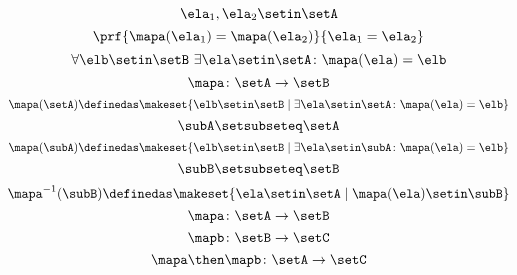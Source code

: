 \begin{forslides}
    \begin{equation}\label{eq:slides_session2_122}
        \ela_1, \ela_2 \setin\setA
    \end{equation}
    \begin{equation}\label{eq:slides_session2_123}
        \prf{\mapa(\ela_1) = \mapa(\ela_2)}{\ela_1 = \ela_2}
    \end{equation}
    \begin{equation}\label{eq:slides_session2_124}
        \forall \elb \setin\setB \ \exists  \ela \setin\setA \colon \mapa(\ela) = \elb
    \end{equation}
    \begin{equation}\label{eq:slides_session2_125}
        \mapa\colon \setA \to \setB
    \end{equation}
    \begin{equation}\label{eq:slides_session2_126}
        \mapa(\setA) \definedas \makeset{ \elb \setin\setB \mid \exists \ela \setin\setA \colon \mapa(\ela) = \elb }
    \end{equation}
    \begin{equation}\label{eq:slides_session2_127}
        \subA \setsubseteq \setA
    \end{equation}
    \begin{equation}\label{eq:slides_session2_128}
        \mapa(\subA) \definedas \makeset{ \elb \setin\setB \mid \exists \ela \setin \subA \colon \mapa(\ela) = \elb }
    \end{equation}
    \begin{equation}\label{eq:slides_session2_129}
        \subB \setsubseteq \setB
    \end{equation}
    \begin{equation}\label{eq:slides_session2_130}
        \mapa^{-1}(\subB) \definedas \makeset{ \ela \setin\setA \mid  \mapa(\ela) \setin \subB}
    \end{equation}
    \begin{equation}\label{eq:slides_session2_131}
        \mapa\colon \setA \to \setB
    \end{equation}
    \begin{equation}\label{eq:slides_session2_132}
        \mapb \colon \setB \to \setC
    \end{equation}
    \begin{equation}\label{eq:slides_session2_133}
        \mapa \then \mapb \colon \setA \to \setC
    \end{equation}
    \begin{equation}\label{eq:slides_session2_134}

\end{equation}
\end{forslides}
